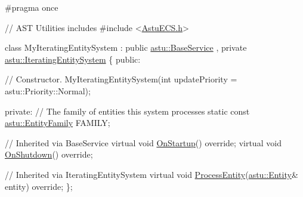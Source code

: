 \begin{DoxyCodeInclude}
\textcolor{preprocessor}{#pragma once}

\textcolor{comment}{// AST Utilities includes}
\textcolor{preprocessor}{#include <\hyperlink{AstuECS_8h}{AstuECS.h}>}

\textcolor{keyword}{class }MyIteratingEntitySystem 
    : \textcolor{keyword}{public} \hyperlink{classastu_1_1BaseService}{astu::BaseService}
    , \textcolor{keyword}{private} \hyperlink{classastu_1_1IteratingEntitySystem}{astu::IteratingEntitySystem}
\{
\textcolor{keyword}{public}:

    \textcolor{comment}{// Constructor.}
    MyIteratingEntitySystem(\textcolor{keywordtype}{int} updatePriority = astu::Priority::Normal);

\textcolor{keyword}{private}:
    \textcolor{comment}{// The family of entities this system processes}
    \textcolor{keyword}{static} \textcolor{keyword}{const} \hyperlink{classastu_1_1EntityFamily}{astu::EntityFamily} FAMILY;

    \textcolor{comment}{// Inherited via BaseService}
    \textcolor{keyword}{virtual} \textcolor{keywordtype}{void} \hyperlink{classastu_1_1Service_a357dc663e000b1f086f681ec3c459bfe}{OnStartup}() \textcolor{keyword}{override};
    \textcolor{keyword}{virtual} \textcolor{keywordtype}{void} \hyperlink{classastu_1_1Service_a1e1dff727df791c57fae782d8a613c5f}{OnShutdown}() \textcolor{keyword}{override};

    \textcolor{comment}{// Inherited via IteratingEntitySystem}
    \textcolor{keyword}{virtual} \textcolor{keywordtype}{void} \hyperlink{classastu_1_1IteratingEntitySystem_a76c7d21da428aa7a6435dc3692fbe6f2}{ProcessEntity}(\hyperlink{classastu_1_1Entity}{astu::Entity}& entity) \textcolor{keyword}{override};
\};
\end{DoxyCodeInclude}


